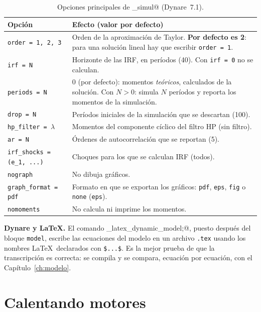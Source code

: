 \documentclass[11pt,a4paper]{report}
\newcounter{tcbrem}[section]
\renewcommand{\thetcbrem}{\thesection.\arabic{tcbrem}}
\newenvironment{remark}{%
  \refstepcounter{tcbrem}%
  \begin{tcolorbox}[remarkstyle, title={Observación~\thetcbrem}]}%
{\end{tcolorbox}}
\newcommand{\code}[1]{\texttt{#1}}
\begin{document}
\begin{table}[H]
\centering\small
\begin{tabular}{>{\raggedright\arraybackslash}p{4.3cm}p{10.2cm}}
\toprule
\textbf{Opción} & \textbf{Efecto (valor por defecto)}\\
\midrule
\code{order = 1, 2, 3} & Orden de la aproximación de Taylor. \textbf{Por defecto es 2}:
  para una solución lineal hay que escribir \code{order = 1}.\\
\code{irf = N} & Horizonte de las IRF, en períodos (40). Con \code{irf = 0} no se calculan.\\
\code{periods = N} & 0 (por defecto): momentos \emph{teóricos}, calculados de la
  solución. Con $N>0$: simula $N$ períodos y reporta los momentos de la simulación.\\
\code{drop = N} & Períodos iniciales de la simulación que se descartan (100).\\
\code{hp\_filter = }$\lambda$ & Momentos del componente cíclico del filtro HP (sin filtro).\\
\code{ar = N} & Órdenes de autocorrelación que se reportan (5).\\
\code{irf\_shocks = (e\_1, ...)} & Choques para los que se calculan IRF (todos).\\
\code{nograph} & No dibuja gráficos.\\
\code{graph\_format = pdf} & Formato en que se exportan los gráficos: \code{pdf},
  \code{eps}, \code{fig} o \code{none} (\code{eps}).\\
\code{nomoments} & No calcula ni imprime los momentos.\\
\bottomrule
\end{tabular}
\caption{Opciones principales de \lstinline@stoch_simul@ (Dynare~7.1).}
\label{tab:stochsimul}
\end{table}

\begin{remark}
\textbf{Dynare y \LaTeX.} El comando \lstinline@write_latex_dynamic_model;@, puesto
después del bloque \code{model}, escribe las ecuaciones del modelo en un archivo
\code{.tex} usando los nombres \LaTeX\ declarados con \code{\$...\$}. Es la mejor prueba
de que la transcripción es correcta: se compila y se compara, ecuación por ecuación, con
el Capítulo~\ref{ch:modelo}.
\end{remark}


\section{Calentando motores}
\label{sec:calentamiento}
\end{document}
